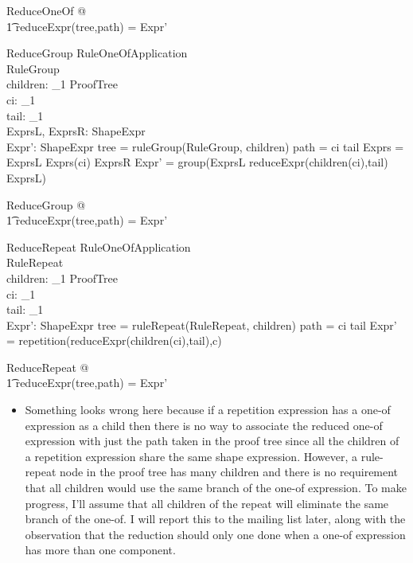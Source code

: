 \documentclass{article}
\begin{document}
\begin{zed}
	\forall ReduceOneOf @ \\
\t1		reduceExpr(tree,path) = Expr'
\end{zed}

\begin{schema}{ReduceGroup}
	RuleOneOfApplication \\
	RuleGroup \\
	children: \seq_1 ProofTree \\
	ci: \nat_1 \\
	tail: \seq \nat_1 \\
	ExprsL, ExprsR: \seq ShapeExpr \\
	Expr': ShapeExpr
\where
	tree = ruleGroup(\theta RuleGroup, children)
\also
	path = \langle ci \rangle \cat tail
\also
	Exprs = ExprsL \cat \langle Exprs(ci) \rangle \cat ExprsR
\also
	Expr' = group(ExprsL \cat \langle reduceExpr(children(ci),tail) \rangle \cat ExprsL)
\end{schema}

\begin{zed}
	\forall ReduceGroup @ \\
\t1		reduceExpr(tree,path) = Expr'
\end{zed}

\begin{schema}{ReduceRepeat}
	RuleOneOfApplication \\
	RuleRepeat \\
	children: \seq_1 ProofTree \\
	ci: \nat_1 \\
	tail: \seq \nat_1 \\
	Expr': ShapeExpr
\where
	tree = ruleRepeat(\theta RuleRepeat, children)
\also
	path = \langle ci \rangle \cat tail
\also
	Expr' = repetition(reduceExpr(children(ci),tail),c)
\end{schema}

\begin{zed}
	\forall ReduceRepeat @ \\
\t1		reduceExpr(tree,path) = Expr'
\end{zed}
\begin{itemize}
\item Something looks wrong here because if a repetition expression has a one-of expression as a child then there is no way
to associate the reduced one-of expression with just the path taken in the proof tree since all the children of a repetition expression
share the same shape expression. However, a rule-repeat node in the proof tree has many children and there is no requirement
that all children would use the same branch of the one-of expression.
To make progress, I'll assume that all children of the repeat will eliminate the same branch of the one-of.
I will report this to the mailing list later, along with the observation that the reduction should only one done when a one-of expression
has more than one component.
\end{itemize}
\end{document}

